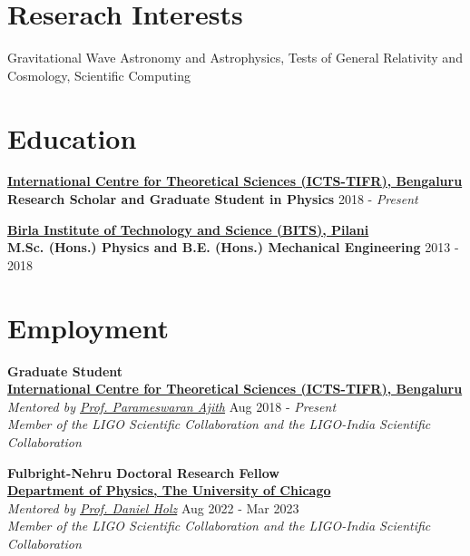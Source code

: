 \documentclass[margin, centered]{res}
\begin{document}
\begin{resume}

\section{Reserach Interests}
Gravitational Wave Astronomy and Astrophysics, Tests of General Relativity and Cosmology, Scientific Computing 
\\
\section{Education}
\textbf{\href{https://www.icts.res.in/}{International Centre for Theoretical Sciences (ICTS-TIFR), Bengaluru}}\\
\textbf{Research Scholar and Graduate Student in Physics} \hfill 2018 - \textit{Present}

\textbf{\href{http://www.bits-pilani.ac.in/}{Birla Institute of Technology and Science (BITS), Pilani}}\\
\textbf{M.Sc. (Hons.) Physics and B.E. (Hons.) Mechanical Engineering} \hfill 2013 - 2018

\section{Employment}
\textbf{Graduate Student}
\\
\textbf{\href{https://www.icts.res.in/}{International Centre for Theoretical Sciences (ICTS-TIFR), Bengaluru}}\\
\emph{Mentored by \href{https://home.icts.res.in/~ajith/Home.html}{Prof. Parameswaran Ajith}} \hfill Aug 2018 - \textit{Present}\\
\textit{Member of the LIGO Scientific Collaboration and the LIGO-India Scientific Collaboration}

\textbf{Fulbright-Nehru Doctoral Research Fellow}
\\
\textbf{\href{https://www.icts.res.in/}{Department of Physics, The University of Chicago}}\\
\emph{Mentored by \href{https://home.icts.res.in/~ajith/Home.html}{Prof. Daniel Holz}} \hfill Aug 2022 - Mar 2023\\
\textit{Member of the LIGO Scientific Collaboration and the LIGO-India Scientific Collaboration}



\end{resume}
\end{document}
